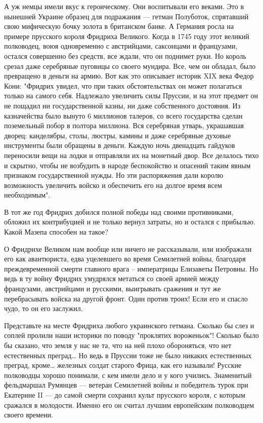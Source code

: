 А уж немцы имели вкус к героическому. Они воспитывали его веками. Это в
нынешней Украине образец для подражания — гетман Полуботок, спрятавший свою
мифическую бочку золота в британском банке. А Германия росла на примере
прусского короля Фридриха Великого. Когда в 1745 году этот великий полководец,
воюя одновременно с австрийцами, саксонцами и французами, остался совершенно
без средств, все ждали, что он поднимет руки. Но король срезал даже серебряные
пуговицы со своего мундира. Все, чем он обладал, было превращено в деньги на
армию. Вот как это описывает историк XIX века Федор Кони: "Фридрих увидел, что
при таких обстоятельствах он может полагаться только на самого себя. Надлежало
увеличить силы Пруссии, и на этот предмет он не пощадил ни государственной
казны, ни даже собственного достояния. Из казначейства было вынуто 6 миллионов
талеров, со всего государства сделан поземельный побор в полтора миллиона. Вся
серебряная утварь, украшавшая дворец: канделябры, столы, люстры, камины и даже
серебряные духовые инструменты были обращены в деньги. Каждую ночь двенадцать
гайдуков переносили вещи на лодки и отправляли их на монетный двор. Все
делалось тихо и скрытно, чтобы не возбудить в народе беспокойство и опасений
таким явным признаком государственной нужды. Но эти распоряжения дали королю
возможность увеличить войско и обеспечить его на долгое время всем
необходимым".

В тот же год Фридрих добился полной победы над своими противниками, обложил их
контрибуцией и не только вернул затраты, но и остался с прибылью. Какой Мазепа
способен на такое?

О Фридрихе Великом нам вообще или ничего не рассказывали, или изображали его
как авантюриста, едва уцелевшего во время Семилетней войны, благодаря
преждевременной смерти главного врага – императрицы Елизаветы Петровны. Но ведь
в ту войну Фридрих умудрялся метаться со своей армией между французами,
австрийцами и русскими, выигрывать сражения и тут же перебрасывать войска на
другой фронт. Один против троих! Если его и спасло чудо, то он его заслужил.

Представьте на месте Фридриха любого украинского гетмана. Сколько бы слез и
соплей пролили наши историки по поводу "проклятих вороженьок"! Сколько было бы
сказано, что земля у нас не та, что на ней плохо обороняться, что нет
естественных преград… Но ведь в Пруссии тоже не было никаких естественных
преград, кроме… железных солдат старого Фрица, как его называли! Русские
полководцы хорошо понимали, с кем имели дело и у кого учились. Знаменитый
фельдмаршал Румянцев — ветеран Семилетней войны и победитель турок при
Екатерине II — до самой смерти сохранил культ прусского короля, с которым
сражался в молодости. Именно его он считал лучшим европейским полководцем
своего времени.


